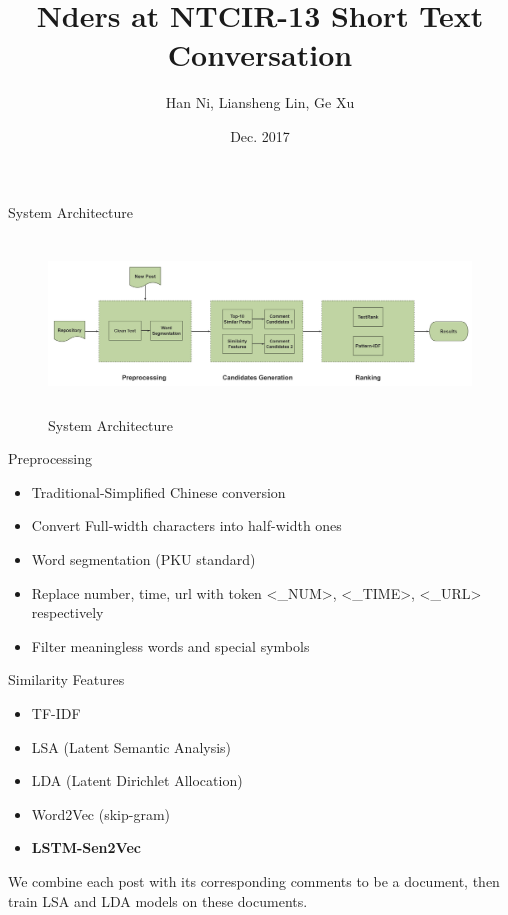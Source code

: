 \documentclass[aspectratio=169]{beamer}
\title{Nders at NTCIR-13 Short Text Conversation }
\author{Han Ni, Liansheng Lin, Ge Xu}
\institute{NetDragon Websoft Inc.}
\date{Dec. 2017}
\begin{document}
  \maketitle


    \begin{frame}{System Architecture}
      \begin{figure}
      \includegraphics[width=14cm,height=4.63cm]{stc-flow-big.png}
      \caption{System Architecture}
      \end{figure}
    \end{frame}

    \begin{frame}{Preprocessing}
      \begin{itemize}
        \item Traditional-Simplified Chinese conversion
        \item Convert Full-width characters into half-width ones
        \item Word segmentation (PKU standard)
        \item Replace number, time, url with token <\_NUM>, <\_TIME>, <\_URL> respectively
        \item Filter meaningless words and special symbols
      \end{itemize}
    \end{frame}

    {
    
    }

    

    \begin{frame}{Similarity Features}
      \begin{itemize}
        \item TF-IDF
        \item LSA (Latent Semantic Analysis)
        \item LDA (Latent Dirichlet Allocation)
        \item Word2Vec (skip-gram)
        \item \textbf{LSTM-Sen2Vec }
      \end{itemize}

      We combine each post with its corresponding comments to be a document, then train LSA and LDA models on these documents.
    \end{frame}
\end{document}
